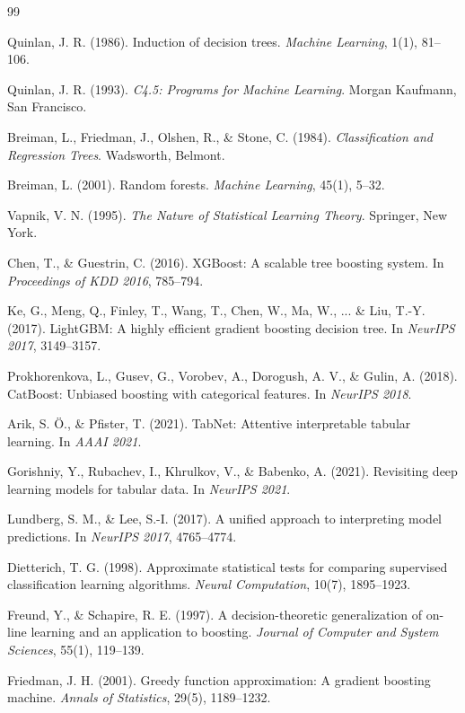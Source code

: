 \documentclass[12pt,a4paper]{article}
\begin{document}
\begin{thebibliography}{99}

 Quinlan, J. R. (1986). Induction of decision trees. \textit{Machine Learning}, 1(1), 81--106.

 Quinlan, J. R. (1993). \textit{C4.5: Programs for Machine Learning}. Morgan Kaufmann, San Francisco.

 Breiman, L., Friedman, J., Olshen, R., \& Stone, C. (1984). \textit{Classification and Regression Trees}. Wadsworth, Belmont.

 Breiman, L. (2001). Random forests. \textit{Machine Learning}, 45(1), 5--32.

 Vapnik, V. N. (1995). \textit{The Nature of Statistical Learning Theory}. Springer, New York.

 Chen, T., \& Guestrin, C. (2016). XGBoost: A scalable tree boosting system. In \textit{Proceedings of KDD 2016}, 785--794.

 Ke, G., Meng, Q., Finley, T., Wang, T., Chen, W., Ma, W., ... \& Liu, T.-Y. (2017). LightGBM: A highly efficient gradient boosting decision tree. In \textit{NeurIPS 2017}, 3149--3157.

 Prokhorenkova, L., Gusev, G., Vorobev, A., Dorogush, A. V., \& Gulin, A. (2018). CatBoost: Unbiased boosting with categorical features. In \textit{NeurIPS 2018}.

 Arik, S. Ö., \& Pfister, T. (2021). TabNet: Attentive interpretable tabular learning. In \textit{AAAI 2021}.

 Gorishniy, Y., Rubachev, I., Khrulkov, V., \& Babenko, A. (2021). Revisiting deep learning models for tabular data. In \textit{NeurIPS 2021}.

 Lundberg, S. M., \& Lee, S.-I. (2017). A unified approach to interpreting model predictions. In \textit{NeurIPS 2017}, 4765--4774.

 Dietterich, T. G. (1998). Approximate statistical tests for comparing supervised classification learning algorithms. \textit{Neural Computation}, 10(7), 1895--1923.

 Freund, Y., \& Schapire, R. E. (1997). A decision-theoretic generalization of on-line learning and an application to boosting. \textit{Journal of Computer and System Sciences}, 55(1), 119--139.

 Friedman, J. H. (2001). Greedy function approximation: A gradient boosting machine. \textit{Annals of Statistics}, 29(5), 1189--1232.

\end{thebibliography}
\end{document}
